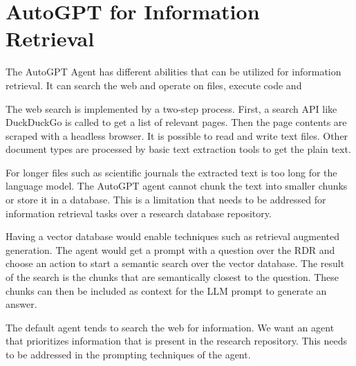 \documentclass[../main.tex]{subfiles}
\begin{document}
\section{AutoGPT for Information Retrieval}

The AutoGPT Agent has different abilities that can be utilized for information retrieval.
It can search the web and operate on files, execute code and

The web search is implemented by a two-step process.
First, a search API like DuckDuckGo is called to get a list of relevant pages.
Then the page contents are scraped with a headless browser.
It is possible to read and write text files.
Other document types are processed by basic text extraction tools to get the plain text.

For longer files such as scientific journals the extracted text is too long for the language model.
The AutoGPT agent cannot chunk the text into smaller chunks or store it in a database.
This is a limitation that needs to be addressed for information retrieval tasks over a research database repository.

Having a vector database would enable techniques such as retrieval augmented generation.
The agent would get a prompt with a question over the RDR and choose an action to start a semantic search over the vector database.
The result of the search is the chunks that are semantically closest to the question.
These chunks can then be included as context for the LLM prompt to generate an answer.

The default agent tends to search the web for information. We want an agent that prioritizes information that is present in the research repository.
This needs to be addressed in the prompting techniques of the agent.
\end{document}

